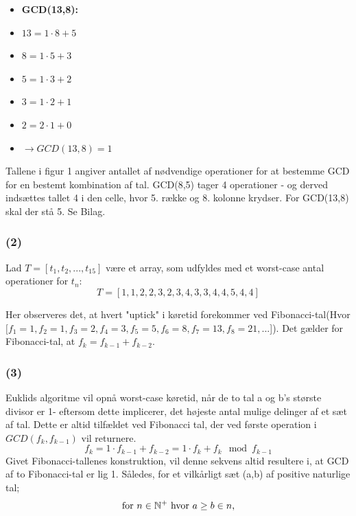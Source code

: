 \documentclass[a4paper,10pt]{article}
\begin{document}
\begin{itemize}
\item{\textbf{GCD(13,8):}}
\item{$13 = 1 \cdot 8 + 5$}
\item{$8 = 1 \cdot 5 + 3$}
\item{$5 = 1 \cdot 3 + 2$}
\item{$3 = 1 \cdot 2 + 1$}
\item{$2 = 2 \cdot 1 + 0$}
\item{$\rightarrow GCD(13,8) = 1$}
\end{itemize}

Tallene i figur 1 angiver antallet af nødvendige operationer for at bestemme GCD for en bestemt kombination af tal. GCD(8,5) tager 4 operationer - og derved indsættes tallet 4 i den celle, hvor 5. række og 8. kolonne krydser. For GCD(13,8) skal der stå 5. Se Bilag.


\subsubsection*{(2)}
Lad $T = [t_{1}, t_{2},...,t_{15}]$ være et array, som udfyldes med et worst-case antal operationer for $t_{n}$:
$$
T = [1, 1, 2, 2, 3, 2, 3, 4, 3, 3, 4, 4, 5, 4, 4]
$$

Her observeres det, at hvert "uptick" i køretid forekommer ved Fibonacci-tal(Hvor $[f_{1}=1, f_{2}=1, f_{3}=2, f_{4}=3, f_{5}=5, f_{6}=8, f_{7}=13, f_{8}=21,...$]). Det gælder for Fibonacci-tal, at $f_{k} = f_{k-1} + f_{k-2}$. 

\subsubsection*{(3)}

Euklids algoritme vil opnå worst-case køretid, når de to tal a og b's største divisor er 1- eftersom dette implicerer, det højeste antal mulige delinger af et sæt af tal. 
Dette er altid tilfældet ved Fibonacci tal, der ved første operation i $GCD(f_{k}, f_{k-1})$ vil returnere.
\begin{equation}
f_{k} = 1 \cdot f_{k-1} + f_{k-2} = 1 \cdot f_{k} + f_{k} \mod f_{k-1}
\end{equation}
Givet Fibonacci-tallenes konstruktion, vil denne sekvens altid resultere i, at GCD af to Fibonacci-tal er lig 1. 
Således, for et vilkårligt sæt (a,b) af positive naturlige tal; 
\begin{equation}
\text{for  $n \in \mathbb{N}^{+}$  hvor $ a \geq b \in n$,}
\end{equation}
\end{document}
